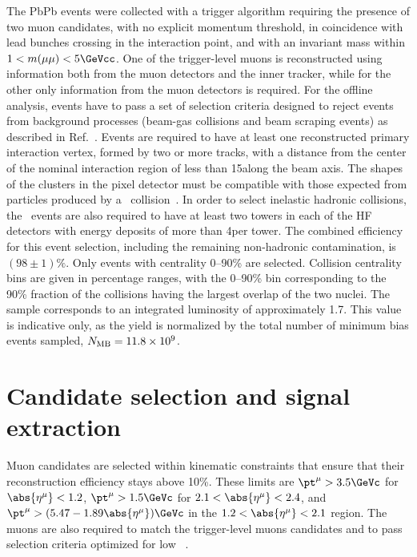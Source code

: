 The PbPb events were collected with a trigger algorithm requiring the presence of two muon candidates, with no explicit momentum threshold, in coincidence with lead bunches crossing in the interaction point, and with an invariant mass within $1<m(\mu\mu)<5 \GeVcc$. One of the trigger-level muons is reconstructed using information both from the muon detectors and the inner tracker, while for the other only information from the muon detectors is required.  
%
For the offline analysis, events have to pass a set of selection criteria designed to reject events from background processes (beam-gas collisions and beam scraping events) as described in Ref.~\cite{Khachatryan:2016odn}. Events are required to have at least one reconstructed primary interaction vertex, formed by two or more tracks, with a distance from the center of the nominal interaction region of less than 15\cm along the beam axis. The shapes of the clusters in the pixel detector must be compatible with those expected from particles produced by a \PbPb\ collision~\cite{Khachatryan:2010xs}. In order to select inelastic hadronic collisions, the \PbPb\ events are also required to have at least two towers in each of the HF detectors with energy deposits of more than 4\GeV per tower. The combined efficiency for this event selection, including the remaining non-hadronic contamination, is $(98\pm1)\%$. 
Only events with centrality 0--90\% are selected. Collision centrality bins are given in percentage ranges,
with the 0--90\% bin corresponding to the 90\% fraction of the collisions having the largest overlap of the two nuclei. 
The \PbPb sample corresponds to an integrated luminosity of approximately 1.7\nbinv.
This value is indicative only, as the \PbPb yield is normalized by the total number of minimum bias events sampled, $N_{\text{MB}} = 11.8 \times 10^9$. 

\section{Candidate selection and signal extraction}
\label{sec:sel}

Muon candidates are selected within kinematic constraints
that ensure that their reconstruction efficiency stays above 10\%. These limits are $\pt^{\mu}>3.5\GeVc$ for $\abs{\eta^{\mu}}<1.2$, $\pt^{\mu}>1.5\GeVc$ for $2.1<\abs{\eta^{\mu}}<2.4$, and $\pt^{\mu} >  (5.47 - 1.89 \abs{\eta^{\mu}}) \GeVc$ in the $1.2<\abs{\eta^{\mu}}<2.1$ region. The muons are also required to match the trigger-level muons candidates and to pass selection criteria optimized for low \pt ~\cite{Chatrchyan:2012xi}. %


